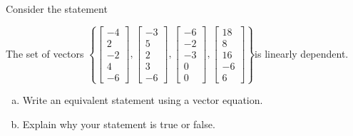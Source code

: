 
\begin{exerciseStatement}


Consider the statement 
\begin{center}\begin{minipage}{0.8\textwidth}
 The set of vectors \( \left\{ \left[\begin{array}{c}
-4 \\
2 \\
-2 \\
4 \\
-6
\end{array}\right] , \left[\begin{array}{c}
-3 \\
5 \\
2 \\
3 \\
-6
\end{array}\right] , \left[\begin{array}{c}
-6 \\
-2 \\
-3 \\
0 \\
0
\end{array}\right] , \left[\begin{array}{c}
18 \\
8 \\
16 \\
-6 \\
6
\end{array}\right] \right\} \)is linearly dependent.
\end{minipage}\end{center}
    


\begin{enumerate}[(a)]
\item  Write an equivalent statement using a vector equation.
\item  Explain why your statement is true or false.
\end{enumerate}
    
\end{exerciseStatement}
    
